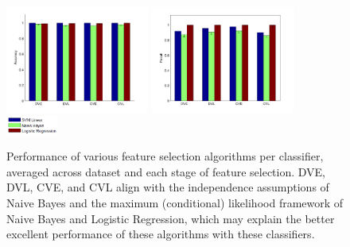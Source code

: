 \begin{figure}[tbp!]
\centering
\includegraphics[width=0.42\textwidth]{./figures/class_perf/Accuracy.pdf}
\includegraphics[width=0.42\textwidth]{./figures/class_perf/Recall.pdf}
\includegraphics[width=0.15\textwidth]{./figures/class_perf/legend.PNG}
\vspace{-6mm}
\caption{\footnotesize Performance of various feature selection algorithms per classifier, averaged across dataset and each stage of feature selection.  DVE, DVL, CVE, and CVL align with the independence assumptions of Naive Bayes and the maximum (conditional) likelihood framework of Naive Bayes and Logistic Regression, which may explain the better excellent performance of these algorithms with these classifiers.}
\label{fig:perf_vs_classifier}
\end{figure}

